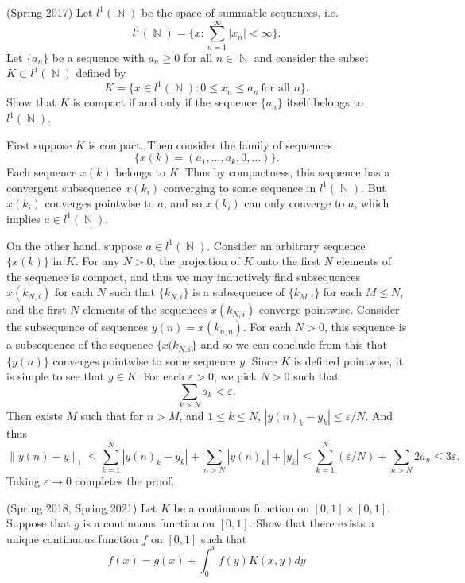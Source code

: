 \documentclass[answers]{exam}
\DeclareMathOperator{\NN}{\mathbb{N}}
\begin{document}
\begin{questions}
\question (Spring 2017)
    Let $l^1(\NN)$ be the space of summable sequences, i.e.
    \[ l^1(\NN) = \{ x : \sum_{n = 1}^\infty |x_n| < \infty \}. \]
    Let $\{ a_n \}$ be a sequence with $a_n \geq 0$ for all $n \in \NN$ and consider the subset $K \subset l^1(\NN)$ defined by
    \[ K = \{ x \in l^1(\NN) : 0 \leq x_n \leq a_n\ \text{for all $n$} \}. \]
    Show that $K$ is compact if and only if the sequence $\{ a_n \}$ itself belongs to $l^1(\NN)$.
\begin{solution}
    First suppose $K$ is compact. Then consider the family of sequences
    \[ \{ x(k) = (a_1,\dots,a_k,0,\dots) \}. \]
    Each sequence $x(k)$ belongs to $K$. Thus by compactness, this sequence has a convergent subsequence $x(k_i)$ converging to some sequence in $l^1(\NN)$. But $x(k_i)$ converges pointwise to $a$, and so $x(k_i)$ can only converge to $a$, which implies $a \in l^1(\NN)$.
    
    On the other hand, suppose $a \in l^1(\NN)$. Consider an arbitrary sequence $\{ x(k) \}$ in $K$. For any $N > 0$, the projection of $K$ onto the first $N$ elements of the sequence is compact, and thus we may inductively find subsequences $x(k_{N,i})$ for each $N$ such that $\{ k_{N,i} \}$ is a subsequence of $\{ k_{M,i} \}$ for each $M \leq N$, and the first $N$ elements of the sequences $x(k_{N,i})$ converge pointwise. Consider the subsequence of sequences $y(n) = x(k_{n,n})$. For each $N > 0$, this sequence is a subsequence of the sequence $\{ x(k_{N,i} \}$ and so we can conclude from this that $\{ y(n) \}$ converges pointwise to some sequence $y$. Since $K$ is defined pointwise, it is simple to see that $y \in K$. For each $\varepsilon > 0$, we pick $N > 0$ such that
    \[ \sum_{k > N} a_k < \varepsilon. \]
    Then exists $M$ such that for $n > M$, and $1 \leq k \leq N$, $|y(n)_k - y_k| \leq \varepsilon / N$. And thus
    \[ \| y(n) - y \|_1 \leq \sum_{k = 1}^N |y(n)_k - y_k| + \sum_{n > N} |y(n)_k| + |y_k| \leq \sum_{k = 1}^N (\varepsilon / N) + \sum_{n > N} 2a_n \leq 3\varepsilon. \]
    Taking $\varepsilon \to 0$ completes the proof.
\end{solution}

\question (Spring 2018, Spring 2021)
  Let $K$ be a continuous function on $[0,1]\times [0,1]$. Suppose that $g$ is a continuous function on $[0,1]$. Show that there exists a unique continuous function $f$ on $[0,1]$ such that
  \begin{equation*}
    f(x)=g(x)+\int_{0}^{x}f(y)K(x,y)dy
  \end{equation*}


\end{questions}
\end{document}
